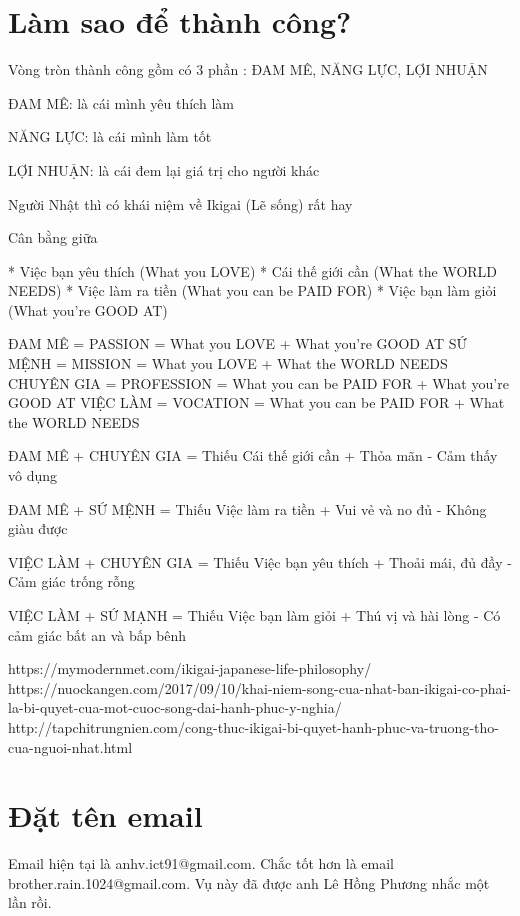 \chapter{Làm sao để thành công?}


Vòng tròn thành công gồm có 3 phần : ĐAM MÊ, NĂNG LỰC, LỢI NHUẬN

ĐAM MÊ: là cái mình yêu thích làm


NĂNG LỰC: là cái mình làm tốt

LỢI NHUẬN: là cái đem lại giá trị cho người khác

Người Nhật thì có khái niệm về Ikigai (Lẽ sống) rất hay 

Cân bằng giữa 

* Việc bạn yêu thích (What you LOVE)
* Cái thế giới cần (What the WORLD NEEDS)
* Việc làm ra tiền (What you can be PAID FOR)
* Việc bạn làm giỏi (What you're GOOD AT)

ĐAM MÊ = PASSION = What you LOVE + What you're GOOD AT
SỨ MỆNH = MISSION = What you LOVE + What the WORLD NEEDS
CHUYÊN GIA = PROFESSION = What you can be PAID FOR + What you're GOOD AT
VIỆC LÀM = VOCATION = What you can be PAID FOR + What the WORLD NEEDS

ĐAM MÊ + CHUYÊN GIA = Thiếu Cái thế giới cần 
+ Thỏa mãn 
- Cảm thấy vô dụng 

ĐAM MÊ + SỨ MỆNH = Thiếu Việc làm ra tiền
+ Vui vẻ và no đủ
- Không giàu được 

VIỆC LÀM + CHUYÊN GIA = Thiếu Việc bạn yêu thích
+ Thoải mái, đủ đầy
- Cảm giác trống rỗng

VIỆC LÀM + SỨ MẠNH = Thiếu Việc bạn làm giỏi
+ Thú vị và hài lòng
- Có cảm giác bất an và bấp bênh 

https://mymodernmet.com/ikigai-japanese-life-philosophy/
https://nuockangen.com/2017/09/10/khai-niem-song-cua-nhat-ban-ikigai-co-phai-la-bi-quyet-cua-mot-cuoc-song-dai-hanh-phuc-y-nghia/
http://tapchitrungnien.com/cong-thuc-ikigai-bi-quyet-hanh-phuc-va-truong-tho-cua-nguoi-nhat.html

\chapter{Đặt tên email}

Email hiện tại là anhv.ict91@gmail.com. Chắc tốt hơn là email brother.rain.1024@gmail.com. Vụ này đã được anh Lê Hồng Phương nhắc một lần rồi.
